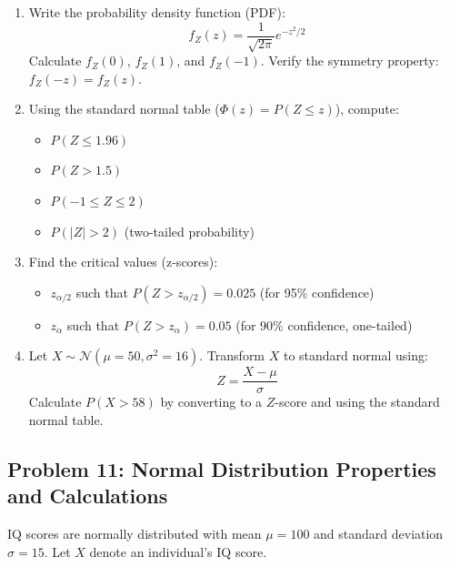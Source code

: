 \documentclass[12pt]{article}
\begin{document}
\begin{enumerate}[label=(\alph*)]
\item Write the probability density function (PDF):
\[
f_Z(z) = \frac{1}{\sqrt{2\pi}}e^{-z^2/2}
\]
Calculate \(f_Z(0)\), \(f_Z(1)\), and \(f_Z(-1)\). Verify the symmetry property: \(f_Z(-z) = f_Z(z)\).

\item Using the standard normal table (\(\Phi(z) = P(Z \leq z)\)), compute:
\begin{itemize}
\item \(P(Z \leq 1.96)\)
\item \(P(Z > 1.5)\)
\item \(P(-1 \leq Z \leq 2)\)
\item \(P(|Z| > 2)\) (two-tailed probability)
\end{itemize}

\item Find the critical values (z-scores):
\begin{itemize}
\item \(z_{\alpha/2}\) such that \(P(Z > z_{\alpha/2}) = 0.025\) (for 95\% confidence)
\item \(z_{\alpha}\) such that \(P(Z > z_{\alpha}) = 0.05\) (for 90\% confidence, one-tailed)
\end{itemize}

\item Let \(X \sim \mathcal{N}(\mu = 50, \sigma^2 = 16)\). Transform \(X\) to standard normal using:
\[
Z = \frac{X - \mu}{\sigma}
\]
Calculate \(P(X > 58)\) by converting to a \(Z\)-score and using the standard normal table.
\end{enumerate}

\subsection*{Problem 11: Normal Distribution Properties and Calculations}

IQ scores are normally distributed with mean \(\mu = 100\) and standard deviation \(\sigma = 15\). Let \(X\) denote an individual's IQ score.
\end{document}
